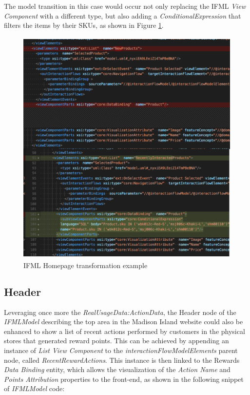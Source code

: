 The model transition in this case would occur not only replacing the IFML \textit{View Component} with a different type, but also adding a \textit{ConditionalExpression} that filters the items by their SKUs, as shown in Figure \ref{fig:ifml-transformation-example}.

\vspace{0.5cm}
\begin{figure}[H]
  \centering
    \includegraphics[height=12cm]{images/madison/ifm-homepage-transformation.png}
  \caption{IFML Homepage transformation example}
  \label{fig:ifml-transformation-example}
\end{figure}
\vspace{0.5cm}

\subsection{Header}
\label{header-updates}

Leveraging once more the \textit{RealUsageData:ActionData}, the Header node of the \textit{IFMLModel} describing the top area in the Madison Island website could also be enhanced to show a list of recent actions performed by customers in the physical stores that generated reward points.  This can be achieved by appending an instance of \textit{List View Component} to the \textit{interactionFlowModelElements} parent node, called \textit{RecentRewardActions}. This instance is then linked to the Rewards \textit{Data Binding} entity, which allows the visualization of the \textit{Action Name} and \textit{Points Attribution} properties to the front-end, as shown in the following snippet of \textit{IFMLModel} code:

